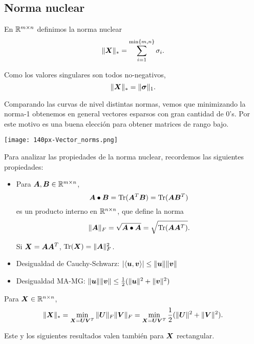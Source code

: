 \subsection{Norma nuclear}

\begin{minipage}[c]{0.7\textwidth}
En $\mathbb{R}^{m \times n}$ definimos la norma nuclear
$$
\| \bm{X} \|_* = \sum_{i=1}^{\min\{m, n\}} \sigma_i.
$$

Como los valores singulares son todos no-negativos,
$$
\| \bm{X} \|_* = \| \bm{\sigma} \|_1.
$$

Comparando las curvas de nivel distintas normas, vemos que minimizando la norma-1 obtenemos en general vectores esparsos con gran cantidad de 0's. Por este motivo es una buena elección para obtener matrices de rango bajo.
\end{minipage}
\begin{minipage}[c]{0.25\textwidth}
\begin{center}
\texttt{[image: 140px-Vector\_norms.png]}
\end{center}
\end{minipage}

Para analizar las propiedades de la norma nuclear, recordemos las siguientes propiedades:
\begin{itemize}
\item Para $\bm{A}, \bm{B} \in \mathbb{R}^{m \times n}$,
$$\bm{A} \bullet \bm{B} = \operatorname{Tr}(\bm{A}^T \bm{B})= \operatorname{Tr}(\bm{A} \bm{B}^T)$$
es un producto interno en $\mathbb{R}^{n \times n}$, que define la norma
$$\|\bm{A}\|_F = \sqrt{\bm{A} \bullet \bm{A}} = \sqrt{\operatorname{Tr}(\bm{A} \bm{A}^T)}.$$

Si $\bm{X} = \bm{A} \bm{A}^T$, $\operatorname{Tr}(\bm{X}) = \|\bm{A}\|_F^2$.
\item Desigualdad de Cauchy-Schwarz: $|\langle \bm{u}, \bm{v} \rangle| \le \|\bm{u}\| \|\bm{v}\|$
\item Desigualdad MA-MG: $\|\bm{u}\| \|\bm{v}\| \le \frac{1}{2}(\|\bm{u}\|^2 + \|\bm{v}\|^2)$
\end{itemize}

\begin{lemma}
Para $\bm{X} \in \mathbb{R}^{n \times n}$,
$$
\|\bm{X}\|_* = \min_{\bm{X} = \bm{U} \bm{V}^T} \|\bm{U}\|_{F} \|\bm{V}\|_{F} = \min_{\bm{X} = \bm{U} \bm{V}^T} \frac{1}{2}(\|\bm{U}\|^2 + \|\bm{V}\|^2).
 $$
\end{lemma}

{\small Este y los siguientes resultados valen también para $\bm{X}$ rectangular.}

